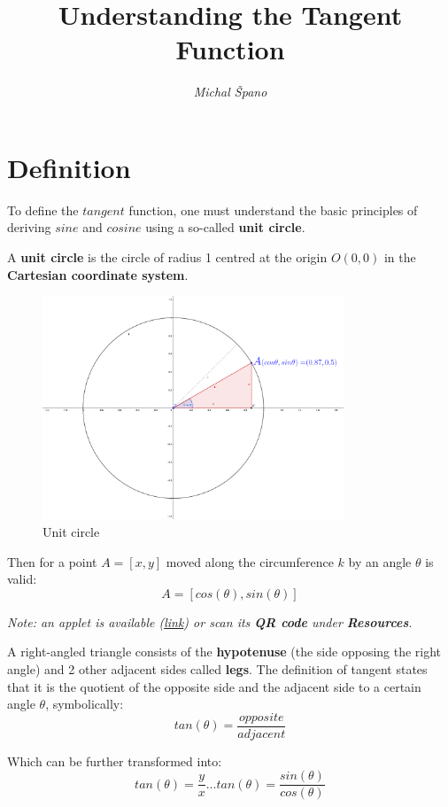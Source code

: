 \documentclass{article}
\title{\textbf{Understanding the Tangent Function}}
\author{\textit{Michal Špano}}
\date{}
\begin{document}
\maketitle

\section{Definition}
To define the $tangent$ function, one must understand the basic principles of deriving $sine$ and $cosine$ using a so-called \textbf{unit circle}.

A \textbf{unit circle} is the circle of radius 1 centred at the origin $O(0, 0)$ in the \textbf{Cartesian coordinate system}.

\begin{figure}[htp]
    \centering
    \includegraphics[width=9cm]{unit_circle.png}
    \caption{Unit circle}
\end{figure}

Then for a point $A = [x, y]$ moved along the circumference $k$ by an angle $\theta$ is valid:\\ 
\[  
A = \left[ cos(\theta), sin(\theta) \right]
\]

\textit{Note: an applet is available (\href{https://www.geogebra.org/m/gvtvjtpf}{link}) or scan its \textbf{QR code} under \textbf{Resources}}.

A right-angled triangle consists of the \textbf{hypotenuse} (the side opposing the right angle) and 2 other adjacent sides called \textbf{legs}. The definition of tangent states that it is the quotient of the opposite side and the adjacent side to a certain angle $\theta$, symbolically: 
\[
tan(\theta) = \frac{opposite}{adjacent}
\]

Which can be further transformed into: 
\[
tan(\theta) = \frac{y}{x} ... tan(\theta) = \frac{sin(\theta)}{cos(\theta)}
\]
\end{document}
